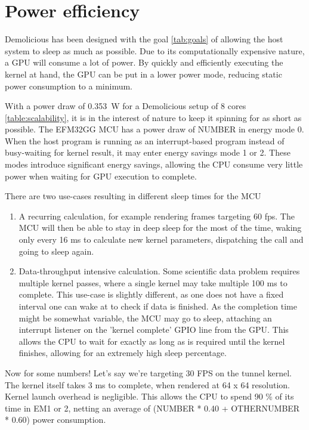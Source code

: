 \documentclass[../main/report.tex]{subfiles}
\begin{document}
\section{Power efficiency}

Demolicious has been designed with the goal \ref{tab:goals} of allowing the host system to sleep as much as possible.
Due to its computationally expensive nature, a GPU will consume a lot of power.
By quickly and efficiently executing the kernel at hand, the GPU can be put in a lower power mode, reducing static power consumption to a minimum.

With a power draw of \SI{0.353}{W} for a Demolicious setup of 8 cores \ref{table:scalability},
it is in the interest of nature to keep it spinning for as short as possible.
The EFM32GG MCU has a power draw of NUMBER in energy mode 0.
When the host program is running as an interrupt-based program instead of busy-waiting for kernel result, it may enter energy savings mode 1 or 2.
These modes introduce significant energy savings, allowing the CPU consume very little power when waiting for GPU execution to complete.

There are two use-cases resulting in different sleep times for the MCU
\begin{enumerate}
  \item
    A recurring calculation, for example rendering frames targeting 60 fps.
    The MCU will then be able to stay in deep sleep for the most of the time, waking only every 16 ms to calculate new kernel parameters, dispatching the call and going to sleep again.
  \item
    Data-throughput intensive calculation.
    Some scientific data problem requires multiple kernel passes, where a single kernel may take multiple 100 ms to complete.
    This use-case is slightly different, as one does not have a fixed interval one can wake at to check if data is finished.
    As the completion time might be somewhat variable, the MCU may go to sleep, attaching an interrupt listener on the 'kernel complete' GPIO line from the GPU.
    This allows the CPU to wait for exactly as long as is required until the kernel finishes, allowing for an extremely high sleep percentage.
\end{enumerate}

Now for some numbers!
Let's say we're targeting 30 FPS on the tunnel kernel.
The kernel itself takes 3 ms to complete, when rendered at 64 x 64 resolution.
Kernel launch overhead is negligible.
This allows the CPU to spend 90 \% of its time in EM1 or 2, netting an average of (NUMBER * 0.40 + OTHERNUMBER * 0.60) power consumption.
\end{document}
